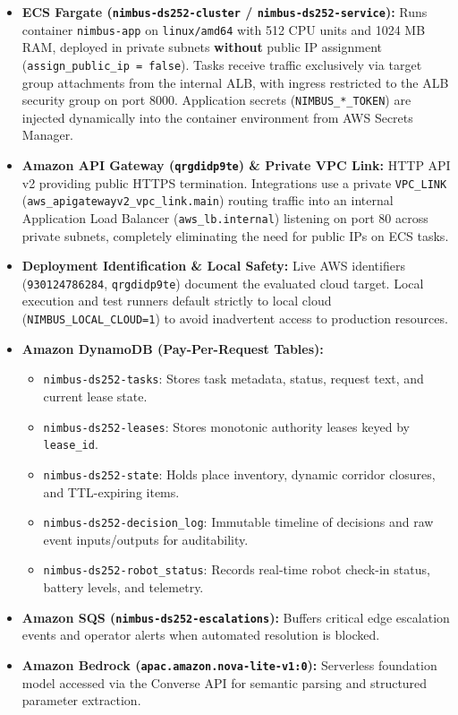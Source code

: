 \documentclass[10pt,letterpaper]{article}
\begin{document}
\begin{itemize}
  \item \textbf{ECS Fargate (\texttt{nimbus-ds252-cluster} / \texttt{nimbus-ds252-service}):} Runs container \texttt{nimbus-app} on \texttt{linux/amd64} with 512 CPU units and 1024 MB RAM, deployed in private subnets \textbf{without} public IP assignment (\texttt{assign\_public\_ip = false}). Tasks receive traffic exclusively via target group attachments from the internal ALB, with ingress restricted to the ALB security group on port 8000. Application secrets (\texttt{NIMBUS\_*\_TOKEN}) are injected dynamically into the container environment from AWS Secrets Manager.
  \item \textbf{Amazon API Gateway (\texttt{qrgdidp9te}) \& Private VPC Link:} HTTP API v2 providing public HTTPS termination. Integrations use a private \texttt{VPC\_LINK} (\texttt{aws\_apigatewayv2\_vpc\_link.main}) routing traffic into an internal Application Load Balancer (\texttt{aws\_lb.internal}) listening on port 80 across private subnets, completely eliminating the need for public IPs on ECS tasks.
  \item \textbf{Deployment Identification \& Local Safety:} Live AWS identifiers (\texttt{930124786284}, \texttt{qrgdidp9te}) document the evaluated cloud target. Local execution and test runners default strictly to local cloud (\texttt{NIMBUS\_LOCAL\_CLOUD=1}) to avoid inadvertent access to production resources.
  \item \textbf{Amazon DynamoDB (Pay-Per-Request Tables):}
  \begin{itemize}
    \item \texttt{nimbus-ds252-tasks}: Stores task metadata, status, request text, and current lease state.
    \item \texttt{nimbus-ds252-leases}: Stores monotonic authority leases keyed by \texttt{lease\_id}.
    \item \texttt{nimbus-ds252-state}: Holds place inventory, dynamic corridor closures, and TTL-expiring items.
    \item \texttt{nimbus-ds252-decision\_log}: Immutable timeline of decisions and raw event inputs/outputs for auditability.
    \item \texttt{nimbus-ds252-robot\_status}: Records real-time robot check-in status, battery levels, and telemetry.
  \end{itemize}
  \item \textbf{Amazon SQS (\texttt{nimbus-ds252-escalations}):} Buffers critical edge escalation events and operator alerts when automated resolution is blocked.
  \item \textbf{Amazon Bedrock (\texttt{apac.amazon.nova-lite-v1:0}):} Serverless foundation model accessed via the Converse API for semantic parsing and structured parameter extraction.
\end{itemize}
\end{document}
